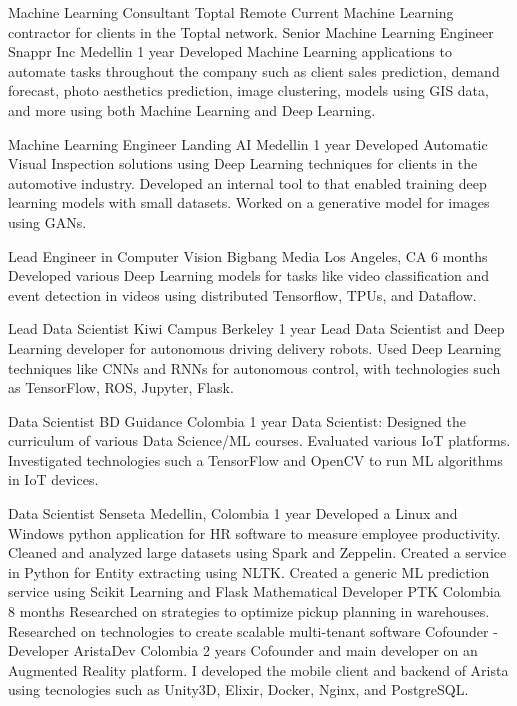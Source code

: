 \begin{cventries}

  \cventry
    {Machine Learning Consultant}
    {Toptal}
    {Remote}
    {Current}
    {
    Machine Learning contractor for clients in the Toptal network.
    }
  \cventry
    {Senior Machine Learning Engineer}
    {Snappr Inc}
    {Medellin}
    {1 year}
    {
    Developed Machine Learning applications to automate tasks throughout the company such as client sales prediction, demand forecast, photo aesthetics prediction, image clustering, models using GIS data, and more using both Machine Learning and Deep Learning.
    }

  \cventry
    {Machine Learning Engineer}
    {Landing AI}
    {Medellin}
    {1 year}
    {
    Developed Automatic Visual Inspection solutions using Deep Learning techniques for clients in the automotive industry. Developed an internal tool to that enabled training deep learning models with small datasets. Worked on a generative model for images using GANs.
    }

  \cventry
    {Lead Engineer in Computer Vision}
    {Bigbang Media}
    {Los Angeles, CA}
    {6 months}
    {
    Developed various Deep Learning models for tasks like video classification and event detection in videos using distributed Tensorflow, TPUs, and Dataflow.
    }
  
  \cventry
    {Lead Data Scientist}
    {Kiwi Campus}
    {Berkeley}
    {1 year}
    {
    Lead Data Scientist and Deep Learning developer for autonomous driving delivery robots. Used
    Deep Learning techniques like CNNs and RNNs for autonomous control,
    with technologies such as TensorFlow, ROS, Jupyter, Flask.
    }

  \cventry
    {Data Scientist}
    {BD Guidance}
    {Colombia}
    {1 year}
    {
    Data Scientist: Designed the curriculum of various
    Data Science/ML courses. Evaluated various IoT platforms. Investigated
    technologies such a TensorFlow and OpenCV to run ML algorithms in IoT
    devices.
    }

  \cventry
    {Data Scientist}
    {Senseta}
    {Medellin, Colombia}
    {1 year}
    {
    Developed a Linux and Windows python
    application for HR software to measure employee productivity. Cleaned
    and analyzed large datasets using Spark and Zeppelin. Created a service in
    Python for Entity extracting using NLTK. Created a generic ML prediction
    service using Scikit Learning and Flask
    }
  \cventry
    {Mathematical Developer}
    {PTK}
    {Colombia}
    {8 months}
    {
    Researched on strategies to optimize
    pickup planning in warehouses. Researched on technologies to create
    scalable multi-tenant software
    }
  \cventry
    {Cofounder - Developer}
    {AristaDev}
    {Colombia}
    {2 years}
    {
    Cofounder and main developer on an
    Augmented Reality platform. I developed the mobile client and backend
    of Arista using tecnologies such as Unity3D, Elixir, Docker, Nginx, and
    PostgreSQL.
    }
\end{cventries}
